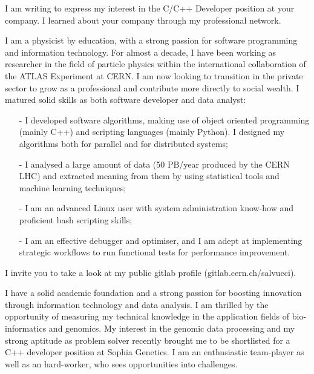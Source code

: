\documentclass[11pt, a4paper]{\TEXPATH awesome-cv}
\begin{document}
\makecvheader %
\makelettertitle %


\begin{cvletter}

  I am writing to express my interest in the C/C++ Developer position at your
  company. I learned about your company through my professional network.

  I am a physicist by education, with a strong passion for software programming
  and information technology. For almost a decade, I have been working as
  researcher in the field of particle physics within the international
  collaboration of the ATLAS Experiment at CERN. I am now looking to transition
  in the private sector to grow as a professional and contribute more directly
  to social wealth. I matured solid skills as both software developer and data
  analyst:
  \begin{itemize}
  \item[-] I developed software algorithms, making use of object oriented
    programming (mainly C++) and scripting languages (mainly Python). I
    designed my algorithms both for parallel and for distributed systems;
  \item[-] I analysed a large amount of data (50 PB/year produced by the
    CERN LHC) and extracted meaning from them by using statistical tools and
    machine learning techniques;
  \item[-] I am an advanced Linux user with system administration know-how and
    proficient bash scripting skills;
  \item[-] I am an effective debugger and optimiser, and I am adept at
    implementing strategic workflows to run functional tests for performance
    improvement.
  \end{itemize}
  I invite you to take a look at my public gitlab profile
  (gitlab.cern.ch/salvucci).
  
  I have a solid academic foundation and a strong passion for boosting
  innovation through information technology and data analysis. I am thrilled by
  the opportunity of measuring my technical knowledge in the application fields
  of bio-informatics and genomics. My interest in the genomic data processing 
  and my strong aptitude as problem solver recently brought me to be
  shortlisted for a C++ developer position at Sophia Genetics.
  I am an enthusiastic team-player as well as an hard-worker, who sees
  opportunities into challenges.
  

\end{cvletter}
\end{document}
